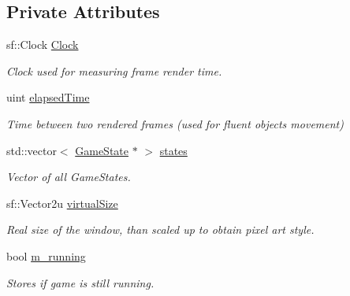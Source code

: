 \subsection*{Private Attributes}
\begin{DoxyCompactItemize}
\item 
\mbox{\label{class_game_engine_ac333df2252a88ef34ec94acd82db6264}} 
sf\+::\+Clock \mbox{\hyperlink{class_game_engine_ac333df2252a88ef34ec94acd82db6264}{Clock}}
\begin{DoxyCompactList}\small\item\em Clock used for measuring frame render time. \end{DoxyCompactList}\item 
\mbox{\label{class_game_engine_a60668e07d7fc0c796bf773745f195cae}} 
uint \mbox{\hyperlink{class_game_engine_a60668e07d7fc0c796bf773745f195cae}{elapsed\+Time}}
\begin{DoxyCompactList}\small\item\em Time between two rendered frames (used for fluent objects movement) \end{DoxyCompactList}\item 
\mbox{\label{class_game_engine_aacfdc453e12dcbf15cadb150839d72dd}} 
std\+::vector$<$ \mbox{\hyperlink{class_game_state}{Game\+State}} $\ast$ $>$ \mbox{\hyperlink{class_game_engine_aacfdc453e12dcbf15cadb150839d72dd}{states}}
\begin{DoxyCompactList}\small\item\em Vector of all Game\+States. \end{DoxyCompactList}\item 
\mbox{\label{class_game_engine_a57b84b09b731bc5664a22f0e517de4dc}} 
sf\+::\+Vector2u \mbox{\hyperlink{class_game_engine_a57b84b09b731bc5664a22f0e517de4dc}{virtual\+Size}}
\begin{DoxyCompactList}\small\item\em Real size of the window, than scaled up to obtain pixel art style. \end{DoxyCompactList}\item 
\mbox{\label{class_game_engine_ae587c23c6915881101bb2110dcb9370e}} 
bool \mbox{\hyperlink{class_game_engine_ae587c23c6915881101bb2110dcb9370e}{m\+\_\+running}}
\begin{DoxyCompactList}\small\item\em Stores if game is still running. \end{DoxyCompactList}\end{DoxyCompactItemize}



